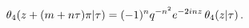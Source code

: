 \[\mathop{\theta_{4}\/}\nolimits\!\left(z+(m+n\tau)\pi\middle|\tau\right)=(-1)^{%
n}q^{-n^{2}}e^{-2inz}\mathop{\theta_{4}\/}\nolimits\!\left(z\middle|\tau\right).\]